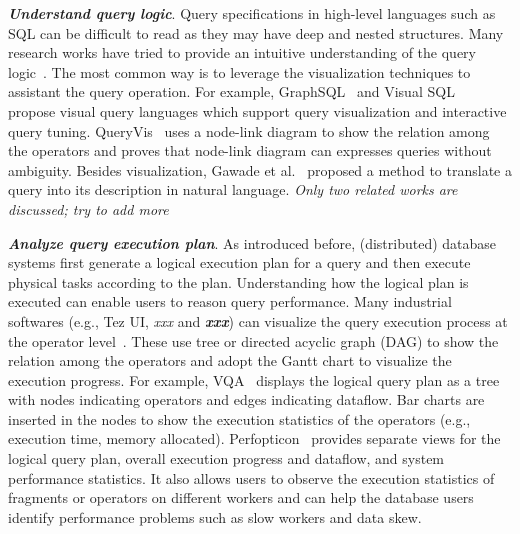 \emph{\textbf{Understand query logic}}. Query specifications in high-level languages such as SQL can be difficult to read as they may have deep and nested structures. Many research works have tried to provide an intuitive understanding of the query logic~\cite{abouzied2012dataplay, gatterbauer2011databases, cerullo2007system,jaakkola2003visual,leventidis2020queryvis,danaparamita2011queryviz}. 
The most common way is to leverage the visualization techniques to assistant the query operation.
For example, GraphSQL~\cite{cerullo2007system} and Visual SQL~\cite{jaakkola2003visual} propose visual query languages which support query visualization and interactive query tuning.
QueryVis~\cite{leventidis2020queryvis} uses a node-link diagram to show the relation among the operators and proves that node-link diagram can expresses queries without ambiguity. Besides visualization, Gawade et al.~\cite{koutrika2010explaining} proposed a method to translate a query into its description in natural language. 
\textit{Only two related works are discussed; try to add more} 

\emph{\textbf{Analyze query execution plan}}. As introduced before, (distributed) database systems first generate a logical execution plan for a query and then execute physical tasks according to the plan. Understanding how the logical plan is executed can enable users to reason query performance. Many industrial softwares (e.g., Tez UI, \textit{xxx} and \textit{\textbf{xxx}}) can visualize the query execution process at the operator level~\cite{tez-ui}. These use tree or directed acyclic graph (DAG) to show the relation among the operators and adopt the Gantt chart to visualize the execution progress. For example, VQA~\cite{simitsis2014vqa} displays the logical query plan as a tree with nodes indicating operators and edges indicating dataflow. Bar charts are inserted in the nodes to show the execution statistics of the operators (e.g., execution time, memory allocated). Perfopticon~\cite{moritz2015perfopticon} provides separate views for the logical query plan, overall execution progress and dataflow, and system performance statistics. It also allows users to observe the execution statistics of fragments or operators on different workers and can help the database users identify performance problems such as slow workers and data skew. 


